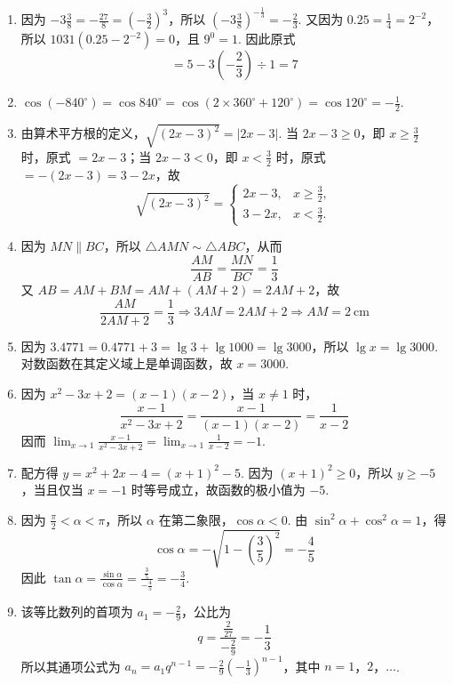 \begin{solution}
\begin{enumerate}
    \item 因为 \( -3\frac{3}{8}=-\frac{27}{8}=\left(-\frac{3}{2}\right)^3 \)，所以 \( \left(-3\frac{3}{8}\right)^{-\frac{1}{3}}=-\frac{2}{3}\). 又因为 \( 0.25=\frac{1}{4}=2^{-2}\)，所以 \( 1031\left(0.25-2^{-2}\right)=0\)，且 \( 9^0=1\). 因此原式
    \[
    =5-3\left(-\frac{2}{3}\right)\div1=7
    \]

    \item \( \cos\left(-840^\circ\right)=\cos840^\circ=\cos\left(2\times360^\circ+120^\circ\right)=\cos120^\circ=-\frac{1}{2}\).

    \item 由算术平方根的定义，\( \sqrt{\left(2x-3\right)^2}=\left|2x-3\right|\). 当 \( 2x-3\geq0\)，即 \(x\geq\frac{3}{2}\) 时，原式 \( =2x-3\)；当 \( 2x-3<0\)，即 \(x<\frac{3}{2}\) 时，原式 \( =-(2x-3)=3-2x\)，故
    \[
    \sqrt{\left(2x-3\right)^2}=\begin{cases}
    2x-3,&x\geq\frac{3}{2},\\
    3-2x,&x<\frac{3}{2}.
    \end{cases}
    \]

    \item 因为 \( MN\parallel BC\)，所以 \( \triangle AMN\sim\triangle ABC\)，从而
    \[
    \frac{AM}{AB}=\frac{MN}{BC}=\frac{1}{3}
    \]
    又 \( AB=AM+BM=AM+(AM+2)=2AM+2\)，故
    \[
    \frac{AM}{2AM+2}=\frac{1}{3}\Longrightarrow 3AM=2AM+2\Longrightarrow AM=2\mathrm{~cm}
    \]

    \item 因为 \( 3.4771=0.4771+3=\lg3+\lg1000=\lg3000\)，所以 \( \lg x=\lg3000\). 对数函数在其定义域上是单调函数，故 \(x=3000\).

    \item 因为 \(x^2-3x+2=(x-1)(x-2)\)，当 \(x\ne1\) 时，
    \[
    \frac{x-1}{x^2-3x+2}=\frac{x-1}{(x-1)(x-2)}=\frac{1}{x-2}
    \]
    因而 \( \displaystyle\lim_{x\to1}\frac{x-1}{x^2-3x+2}=\lim_{x\to1}\frac{1}{x-2}=-1\).

    \item 配方得 \(y=x^2+2x-4=(x+1)^2-5\). 因为 \((x+1)^2\geq0\)，所以 \(y\geq-5\)，当且仅当 \(x=-1\) 时等号成立，故函数的极小值为 \(-5\).

    \item 因为 \( \frac{\pi}{2}<\alpha<\pi\)，所以 \( \alpha\) 在第二象限，\( \cos\alpha<0\). 由 \( \sin^2\alpha+\cos^2\alpha=1\)，得
    \[
    \cos\alpha=-\sqrt{1-\left(\frac{3}{5}\right)^2}=-\frac{4}{5}
    \]
    因此 \( \tan\alpha=\frac{\sin\alpha}{\cos\alpha}=\frac{\frac{3}{5}}{-\frac{4}{5}}=-\frac{3}{4}\).

    \item 该等比数列的首项为 \(a_1=-\frac{2}{9}\)，公比为
    \[
    q=\frac{\frac{2}{27}}{-\frac{2}{9}}=-\frac{1}{3}
    \]
    所以其通项公式为 \(a_n=a_1q^{n-1}=-\frac{2}{9}\left(-\frac{1}{3}\right)^{n-1}\)，其中 \(n=1\)，\(2\)，\(\ldots\).
\end{enumerate}
\end{solution}

